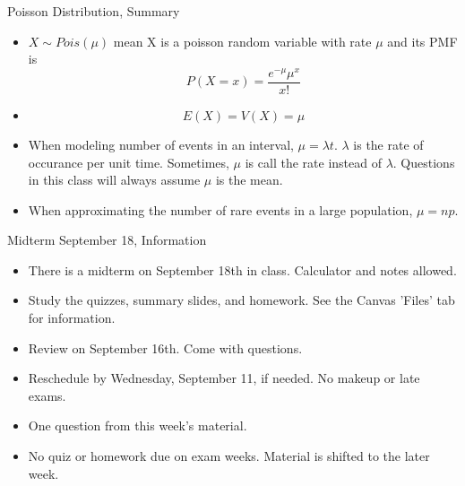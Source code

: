 \documentclass[]{beamer}
\begin{document}
    \begin{frame}{Poisson Distribution, Summary}
        \begin{itemize}
            \item $X\sim Pois(\mu)$ mean X is a poisson random variable with rate $\mu$ and its PMF is
            $$P(X=x)=\frac{e^{-\mu}\mu^x}{x!}$$
            \item $$E(X) = V(X) = \mu $$
            \item When modeling number of events in an interval, $\mu = \lambda t$. $\lambda$ is the rate of occurance per unit time. Sometimes, $\mu$ is call the rate instead of $\lambda$. Questions in this class will always assume $\mu$ is the mean.
            \item When approximating the number of rare events in a large population, $\mu = np$. 
        \end{itemize}
    \end{frame}

    \begin{frame}{Midterm September 18, Information}
        \begin{itemize}
            \item There is a midterm on September 18th in class. Calculator and notes allowed.
            \item Study the quizzes, summary slides, and homework. See the Canvas 'Files' tab for information.
            \item Review on September 16th. Come with questions.
            \item Reschedule by Wednesday, September 11, if needed. No makeup or late exams.
            \item One question from this week's material.
            \item No quiz or homework due on exam weeks. Material is shifted to the later week.
        \end{itemize}
    \end{frame}
\end{document}
